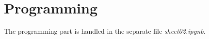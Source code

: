 \documentclass{article}
\begin{document}
\section{Programming}


The programming part is handled in the separate file \textit{sheet02.ipynb}.


%

%

\end{document}
